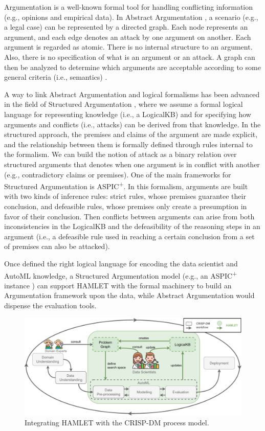 Argumentation is a well-known formal tool for handling conflicting information (e.g., opinions and empirical data).
In Abstract Argumentation \cite{Dung1995abstractArg}, a scenario (e.g., a legal case) can be represented by a directed graph.
Each node represents an argument, and each edge denotes an attack by one argument on another. Each argument is regarded as atomic. There is no internal structure to an argument. Also, there is no specification of what is an argument or an attack. A graph can then be analyzed to determine which arguments are acceptable according to some general criteria (i.e., semantics) \cite{baroniCG11semantics}.

A way to link Abstract Argumentation and logical formalisms has been advanced in the field of Structured Argumentation \cite{BesnardGHMPST14structured}, where we assume a formal logical language for representing knowledge (i.e., a LogicalKB) and for specifying how arguments and conflicts (i.e., attacks) can be derived from that knowledge. 
In the structured approach, the premises and claims of the argument are made explicit, and the relationship between them is formally defined through rules internal to the formalism.
We can build the notion of attack as a binary relation over structured arguments that denotes when one argument is in conflict with another (e.g., contradictory claims or premises).
One of the main frameworks for Structured Argumentation is ASPIC\textsuperscript{+}\cite{Modgil2014aspic+}.
In this formalism, arguments are built with two kinds of inference rules: strict rules, whose premises guarantee their conclusion, and defeasible rules, whose premises only create a presumption in favor of their conclusion.
Then conflicts between arguments can arise from both inconsistencies in the LogicalKB and the defeasibility of the reasoning steps in an argument (i.e., a defeasible rule used in reaching a certain conclusion from a set of premises can also be attacked).

Once defined the right logical language for encoding the data scientist and AutoML knowledge, a Structured Argumentation model (e.g., an ASPIC\textsuperscript{+} instance \cite{arg2p-jlc}) can support HAMLET with the formal machinery to build an Argumentation framework upon the data, while Abstract Argumentation would dispense the evaluation tools.


\begin{figure}[t]
    \centering
    \includegraphics[width=1\columnwidth]{chapters/human-centric/hamlet/img/dymmymodel.pdf}
    \caption{Integrating HAMLET with the CRISP-DM process model.}
    \label{hamlet-fig:approach}
\end{figure}

